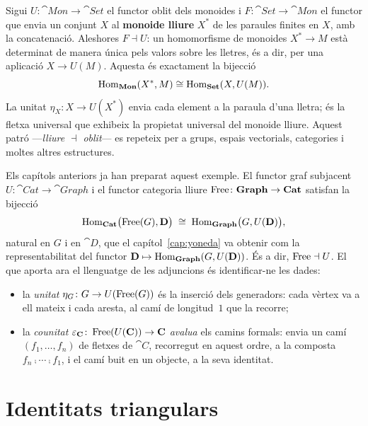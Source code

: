 \begin{exemple}
Sigui $U\colon\cat{Mon}\to\cat{Set}$ el functor oblit dels monoides i $F\colon\cat{Set}\to\cat{Mon}$ el functor que envia un conjunt $X$ al \textbf{monoide lliure} $X^*$ de les paraules finites en $X$, amb la concatenació. Aleshores $F\dashv U$: un homomorfisme de monoides $X^*\to M$ està determinat de manera única pels valors sobre les lletres, és a dir, per una aplicació $X\to U(M)$. Aquesta és exactament la bijecció
\[
\operatorname{Hom}_{\mathbf{Mon}}(X^*,M)\cong\operatorname{Hom}_{\mathbf{Set}}(X,U(M)).
\]
La unitat $\eta_X\colon X\to U(X^*)$ envia cada element a la paraula d'una lletra; és la fletxa universal que exhibeix la propietat universal del monoide lliure. Aquest patró ---\emph{lliure $\dashv$ oblit}--- es repeteix per a grups, espais vectorials, categories i moltes altres estructures.
\end{exemple}

\begin{exemple}\label{ex:free-u-adjuncio}
Els capítols anteriors ja han preparat aquest exemple. El functor graf subjacent $U\colon\cat{Cat}\to\cat{Graph}$ i el functor categoria lliure $\operatorname{Free}\colon\mathbf{Graph}\to\mathbf{Cat}$ satisfan la bijecció
\[
\operatorname{Hom}_{\mathbf{Cat}}\bigl(\operatorname{Free}(G),\mathbf{D}\bigr)\;\cong\;\operatorname{Hom}_{\mathbf{Graph}}\bigl(G,U(\mathbf{D})\bigr),
\]
natural en $G$ i en $\cat{D}$, que el capítol~\ref{cap:yoneda} va obtenir com la representabilitat del functor $\mathbf{D}\mapsto\operatorname{Hom}_{\mathbf{Graph}}(G,U(\mathbf{D}))$. És a dir, $\operatorname{Free}\dashv U$. El que aporta ara el llenguatge de les adjuncions és identificar-ne les dades:
\begin{itemize}
  \item la \emph{unitat} $\eta_G\colon G\to U(\operatorname{Free}(G))$ és la inserció dels generadors: cada vèrtex va a ell mateix i cada aresta, al camí de longitud~$1$ que la recorre;
  \item la \emph{counitat} $\varepsilon_{\mathbf{C}}\colon\operatorname{Free}(U(\mathbf{C}))\to\mathbf{C}$ \emph{avalua} els camins formals: envia un camí $(f_1,\dots,f_n)$ de fletxes de $\cat{C}$, recorregut en aquest ordre, a la composta $f_n\comp\cdots\comp f_1$, i el camí buit en un objecte, a la seva identitat.
\end{itemize}
\end{exemple}

\section{Identitats triangulars}

